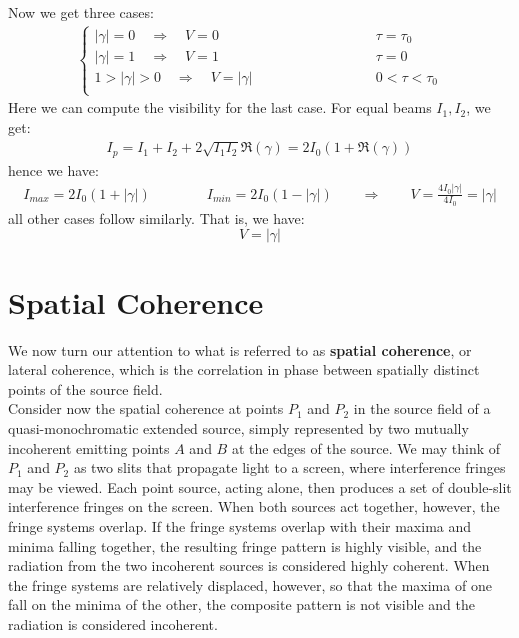 \documentclass[11pt]{book}
\theoremstyle{break}
\theoremstyle{break}
\begin{document}
Now we get three cases:
\begin{align*}
\begin{cases}
 |\gamma| = 0\quad\Rightarrow\quad  V=0\qquad\qquad\qquad\qquad& \tau = \tau_0\\
 |\gamma| = 1\quad\Rightarrow\quad  V=1\qquad\qquad\qquad\qquad& \tau =0\\
 1>|\gamma| >0\quad\Rightarrow\quad  V=|\gamma|\qquad\qquad\qquad\qquad& 0<\tau < \tau_0\\
\end{cases}
\end{align*}
Here we can compute the visibility for the last case. For equal beams $I_1,I_2$, we get:
\begin{align*}
I_p = I_1 + I_2 + 2\sqrt{I_1I_2}\Re(\gamma) = 2I_0(1+ \Re(\gamma))
\end{align*}
hence we have:
\begin{align*}
I_{max} = 2I_0(1+|\gamma|) \qquad\qquad I_{min} = 2I_0(1-|\gamma|) \qquad \Rightarrow \qquad V = \frac{4I_0|\gamma|}{4I_0} = |\gamma|
\end{align*}
all other cases follow similarly. That is, we have: 
$$V = |\gamma|$$

\newpage
\section[Spatial Coherence]{\color{red} Spatial Coherence\color{black}}
We now turn our attention to what is referred to as \textbf{spatial coherence}, or lateral coherence, which is the correlation in phase between spatially distinct points
of the source field.\\

Consider now the spatial coherence at points $P_1$ and $P_2$ in the source field of a quasi-monochromatic extended source, simply represented by two mutually incoherent emitting points $A$ and $B$ at the edges of the source. We may think of $P_1$ and $P_2$ as two slits that propagate light to a screen, where interference fringes may be viewed. Each point source, acting alone, then
produces a set of double-slit interference fringes on the screen. When both sources act together, however, the fringe systems overlap. If the fringe systems overlap with their maxima and minima falling together, the resulting fringe pattern is highly visible, and the radiation from the two incoherent sources is considered highly coherent. When the fringe systems are relatively displaced, however, so that the maxima of one fall on the minima of the other, the composite pattern is not visible and the radiation is considered incoherent. 
\end{document}
